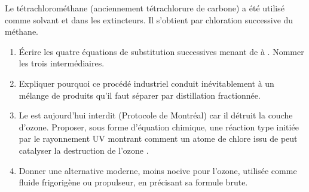 \documentclass[11pt]{article}
\begin{document}
\begin{exercice}
Le tétrachlorométhane  (anciennement tétrachlorure de carbone) a été utilisé comme solvant et dans les extincteurs. Il s'obtient par chloration successive du méthane.
\begin{enumerate}
    \item Écrire les quatre équations de substitution successives menant de  à . Nommer les trois intermédiaires.
    \item Expliquer pourquoi ce procédé industriel conduit inévitablement à un mélange de produits qu'il faut séparer par distillation fractionnée.
    \item Le  est aujourd'hui interdit (Protocole de Montréal) car il détruit la couche d'ozone. Proposer, sous forme d'équation chimique, une réaction type initiée par le rayonnement UV montrant comment un atome de chlore issu de  peut catalyser la destruction de l'ozone .
    \item Donner une alternative moderne, moins nocive pour l'ozone, utilisée comme fluide frigorigène ou propulseur, en précisant sa formule brute.
\end{enumerate}
\end{exercice}
\end{document}
